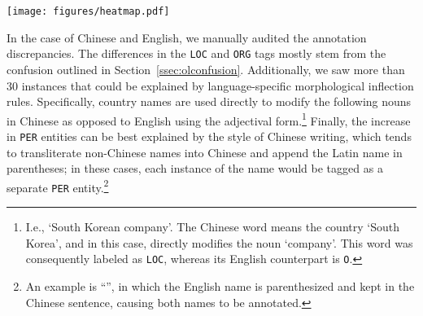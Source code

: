 \begin{figure*}[t]
\centering
\texttt{[image: figures/heatmap.pdf]}
\caption{Heatmap of micro F\textsubscript{1} scores on test sets with different fine-tuned models. y-axis indicates the dataset that the model is fine-tuned in, and the x-axis indicates the datasets that the models are evaluated on. \textbf{Left}: Model performance on datasets that contains the train, dev and test splits. The highlighted diagonal cells are the in-dataset results. \textbf{Center}: Model performance on the PUD datasets. \textbf{Right}: Model performance on all other datasets.}
\label{fig:baseline}
\end{figure*}

In the case of Chinese and English, we manually audited the annotation discrepancies. The differences in the \texttt{LOC} and \texttt{ORG} tags mostly stem from the confusion outlined in Section~\ref{ssec:olconfusion}.
Additionally, we saw more than 30 instances that could be explained by language-specific morphological inflection rules.
Specifically, country names are used directly to modify the following nouns in Chinese as opposed to English using the adjectival form.\footnote{I.e.,  `South Korean company'. The Chinese word  means the country `South Korea', and in this case, directly modifies the noun  `company'. This word was consequently labeled as \texttt{LOC}, whereas its English counterpart is \texttt{O}.}
Finally, the increase in \texttt{PER} entities can be best explained by the style of Chinese writing, which tends to transliterate non-Chinese names into Chinese and append the Latin name in parentheses; in these cases, each instance of the name would be tagged as a separate \texttt{PER} entity.\footnote{An example is ``'', in which the English name is parenthesized and kept in the Chinese sentence, causing both names to be annotated.}








